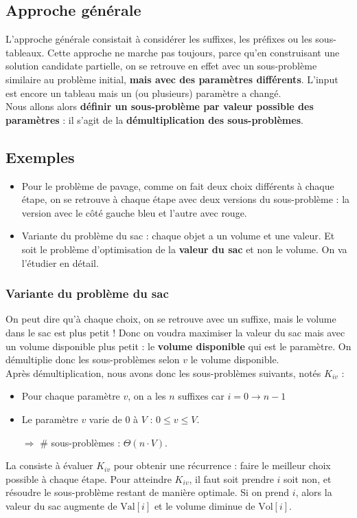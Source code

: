 \documentclass[12pt,a4paper]{book}
\begin{document}
\subsection{Approche générale}
L'approche générale consistait à considérer les suffixes, les préfixes ou les sous-tableaux. Cette approche ne marche pas toujours, parce qu'en construisant une solution candidate partielle, on se retrouve en effet avec un sous-problème similaire au problème initial, \textbf{mais avec des paramètres différents}. L'input est encore un tableau mais un (ou plusieurs) paramètre a changé. \\

Nous allons alors \textbf{définir un sous-problème par valeur possible des paramètres} : il s'agit de la \textbf{démultiplication des sous-problèmes}.

\subsection{Exemples}
\begin{itemize}
\item Pour le problème de pavage, comme on fait deux choix différents à chaque étape, on se retrouve à chaque étape avec deux versions du sous-problème : la version avec le côté gauche bleu et l'autre avec rouge.
\item Variante du problème du sac : chaque objet a un volume et une valeur. Et soit le problème d'optimisation de la \textbf{valeur du sac} et non le volume. On va l'étudier en détail.
\end{itemize}
\subsubsection{Variante du problème du sac}
On peut dire qu'à chaque choix, on se retrouve avec un suffixe, mais le volume dans le sac est plus petit ! Donc on voudra maximiser la valeur du sac mais avec un volume disponible plus petit : le \textbf{volume disponible} qui est le paramètre. On démultiplie donc les sous-problèmes selon $v$ le volume disponible. \\

Après démultiplication, nous avons donc les sous-problèmes suivants, notés $K_{iv}$ :
\begin{itemize}
\item Pour chaque paramètre $v$, on a les $n$ suffixes car $i = 0 \longrightarrow n-1$
\item Le paramètre $v$ varie de $0$ à $V$ : $0\leq v \leq V$.
\item[$\Rightarrow$] \# sous-problèmes : $\Theta(n\cdot V)$.
\end{itemize}
La  consiste à évaluer $K_{iv}$ pour obtenir une récurrence : faire le meilleur choix possible à chaque étape. Pour atteindre $K_{iv}$, il faut soit prendre $i$ soit non, et résoudre le sous-problème restant de manière optimale. Si on prend $i$, alors la valeur du sac augmente de $\text{Val}[i]$ et le volume diminue de $\text{Vol}[i]$. 
\end{document}
